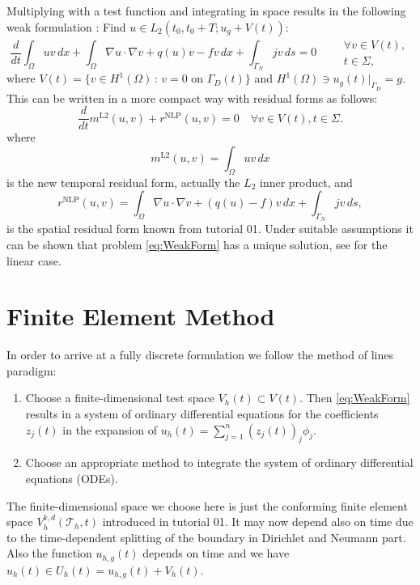 \documentclass[a4paper,12pt]{article}
\begin{document}
Multiplying with a test function and integrating in space
results in the following weak formulation \cite{Ern}:
Find $u\in L_2(t_0,t_0+T;u_g+V(t))$:
\begin{equation}
\frac{d}{dt} \int_\Omega u v \,dx+ \int_\Omega \nabla u \cdot \nabla v
+ q(u) v - f v \, dx + \int_{\Gamma_N} jv \, ds = 0 \qquad
\begin{array}{l}
\forall v \in V(t),\\
t \in \Sigma,
\end{array}
\label{eq:WeakForm}
\end{equation}
where $V(t) = \{v\in H^1(\Omega)\,:\, \text{$v=0$ on $\Gamma_D(t)$}\}$
and $H^1(\Omega)\ni u_g(t)|_{\Gamma_D}=g$. This can be written in a more compact way
with residual forms as follows:
\begin{equation*}
\frac{d}{dt} m^{\text{L2}}(u,v) + r^{\text{NLP}}(u,v) = 0 \quad \forall v \in V(t), t \in \Sigma.
\end{equation*}
where
\begin{equation*}
m^{\text{L2}}(u,v) = \int_\Omega u v \,dx
\end{equation*}
is the new temporal residual form, actually the $L_2$ inner product, and
\begin{equation*}
r^{\text{NLP}}(u,v) = \int_\Omega \nabla u \cdot \nabla v + (q(u)-f)v\,dx + \int_{\Gamma_N} jv\,ds ,
\end{equation*}
is the spatial residual form known from tutorial 01.
Under suitable assumptions it can be shown that problem \eqref{eq:WeakForm} has
a unique solution, see \cite{Ern} for the linear case.

\section{Finite Element Method}

In order to arrive at a fully discrete formulation we follow the method of lines
paradigm:
\begin{enumerate}[1)]
\item Choose a finite-dimensional test space $V_h(t)\subset V(t)$. Then \eqref{eq:WeakForm}
results in a system of ordinary differential equations for the coefficients $z_j(t)$
in the expansion of $u_h(t)=\sum_{j=1}^n (z_j(t))_j \phi_j$.
\item Choose an appropriate method to integrate the system of ordinary differential equations (ODEs).
\end{enumerate}

The finite-dimensional space we choose here is just the conforming
finite element space $V_h^{k,d}(\mathcal{T}_h,t)$ introduced in tutorial 01.
It may now depend also on time due to the time-dependent splitting of the boundary
in Dirichlet and Neumann part. Also the function $u_{h,g}(t)$ depends on time
and we have $u_h(t)\in U_h(t) = u_{h,g}(t) + V_h(t)$.
\end{document}

